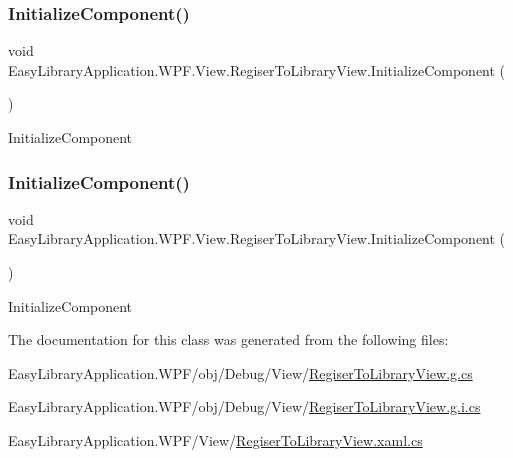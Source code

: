 \subsubsection{\texorpdfstring{Initialize\+Component()}{InitializeComponent()}\hspace{0.1cm}{\footnotesize\ttfamily [1/2]}}
{\footnotesize\ttfamily void Easy\+Library\+Application.\+W\+P\+F.\+View.\+Regiser\+To\+Library\+View.\+Initialize\+Component (\begin{DoxyParamCaption}{ }\end{DoxyParamCaption})}



Initialize\+Component 

\mbox{\label{class_easy_library_application_1_1_w_p_f_1_1_view_1_1_regiser_to_library_view_a4b64a06d6b400c4651aa08bbc0aa87a5}} 
\subsubsection{\texorpdfstring{Initialize\+Component()}{InitializeComponent()}\hspace{0.1cm}{\footnotesize\ttfamily [2/2]}}
{\footnotesize\ttfamily void Easy\+Library\+Application.\+W\+P\+F.\+View.\+Regiser\+To\+Library\+View.\+Initialize\+Component (\begin{DoxyParamCaption}{ }\end{DoxyParamCaption})}



Initialize\+Component 



The documentation for this class was generated from the following files\+:\begin{DoxyCompactItemize}
\item 
Easy\+Library\+Application.\+W\+P\+F/obj/\+Debug/\+View/\mbox{\hyperlink{_regiser_to_library_view_8g_8cs}{Regiser\+To\+Library\+View.\+g.\+cs}}\item 
Easy\+Library\+Application.\+W\+P\+F/obj/\+Debug/\+View/\mbox{\hyperlink{_regiser_to_library_view_8g_8i_8cs}{Regiser\+To\+Library\+View.\+g.\+i.\+cs}}\item 
Easy\+Library\+Application.\+W\+P\+F/\+View/\mbox{\hyperlink{_regiser_to_library_view_8xaml_8cs}{Regiser\+To\+Library\+View.\+xaml.\+cs}}\end{DoxyCompactItemize}
